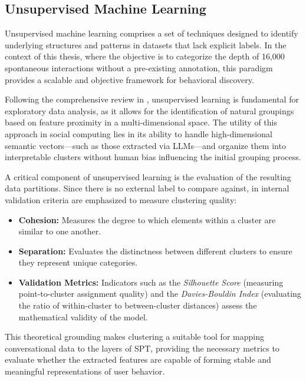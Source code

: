 

\subsection{Unsupervised Machine Learning}
\label{sec:metrics_label}
Unsupervised machine learning comprises a set of techniques designed to identify underlying structures and patterns in datasets that lack explicit labels. In the context of this thesis, where the objective is to categorize the depth of 16,000 spontaneous interactions without a pre-existing %
annotation, this paradigm provides a scalable and objective framework for behavioral discovery.

Following the comprehensive review in \cite{Naeem2023}, unsupervised learning is fundamental for exploratory data analysis, as it allows for the identification of natural groupings based on feature proximity in a multi-dimensional space. The utility of this approach in social computing lies in its ability to handle high-dimensional semantic vectors—such as those extracted via LLMs—and organize them into interpretable clusters without human bias influencing the initial grouping process.



A critical component of unsupervised learning is the evaluation of the resulting data partitions. Since there is no external label to compare against, in \cite{Naeem2023} internal validation criteria are emphasized to measure clustering quality:
\begin{itemize}
    \item \textbf{Cohesion:} Measures the degree to which elements within a cluster are similar to one another.
    \item \textbf{Separation:} Evaluates the distinctness between different clusters to ensure they represent unique categories.
    \item \textbf{Validation Metrics:} Indicators such as the \textit{Silhouette Score} (measuring point-to-cluster assignment quality) and the \textit{Davies-Bouldin Index} (evaluating the ratio of within-cluster to between-cluster distances)  assess the mathematical validity of the model.
\end{itemize}

This theoretical grounding makes clustering a suitable tool for mapping conversational data to the layers of SPT, providing the necessary metrics to evaluate whether the extracted features are capable of forming stable and meaningful representations of user behavior.
    
